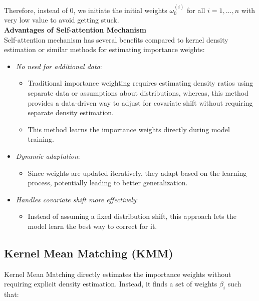 Therefore, instead of $0$, we initiate the initial weights $\omega^{(i)}_0$ for all $i = 1, \ldots, n$ with very low value to avoid getting stuck.\\




\textbf{Advantages of Self-attention Mechanism}\\

Self-attention mechanism has several benefits compared to kernel density estimation or similar methods for estimating importance weights:

\begin{itemize}
    \item \emph{No need for additional data}:
    \begin{itemize}
        \item Traditional importance weighting requires estimating density ratios using separate data or assumptions about distributions, whereas, this method provides a data-driven way to adjust for covariate shift without requiring separate density estimation.
        \item This method learns the importance weights directly during model training.
    \end{itemize}
    \item \emph{Dynamic adaptation}:
    \begin{itemize}
        \item Since weights are updated iteratively, they adapt based on the learning process, potentially leading to better generalization.
    \end{itemize}
    \item \emph{Handles covariate shift more effectively}:
    \begin{itemize}
        \item Instead of assuming a fixed distribution shift, this approach lets the model learn the best way to correct for it.
    \end{itemize}
\end{itemize}

\subsection{Kernel Mean Matching (KMM)}

Kernel Mean Matching \citep{gretton2009covariate} directly estimates the importance weights without requiring explicit density estimation. Instead, it finds a set of weights $\beta_i$ such that:


